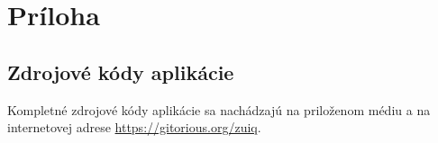 \chapter{Príloha}

\section*{Zdrojové kódy aplikácie}

Kompletné zdrojové kódy aplikácie sa nachádzajú na priloženom médiu a na internetovej adrese \url{https://gitorious.org/zuiq}.